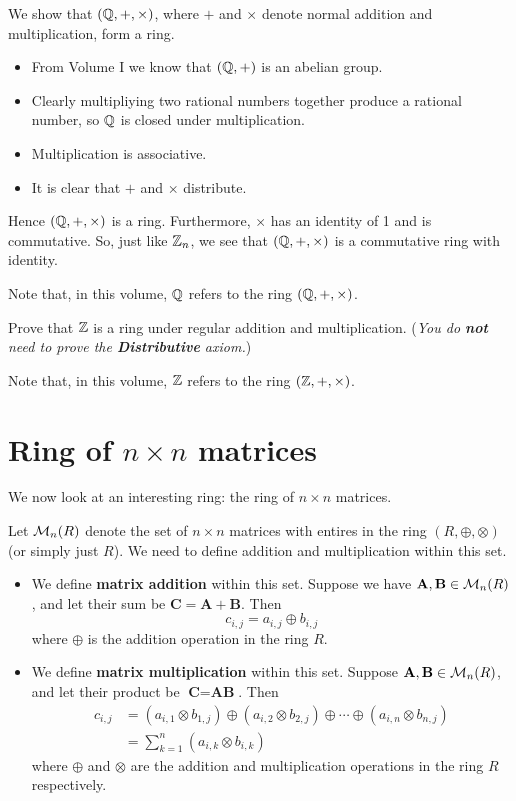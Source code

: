 \begin{example}
    We show that $(\mathbb{Q}, +, \times)$, where $+$ and $\times$ denote normal addition and multiplication, form a ring.
    \begin{itemize}
        \item From Volume I we know that $(\mathbb{Q}, +)$ is an abelian group.
        \item Clearly multipliying two rational numbers together produce a rational number, so $\mathbb{Q}$ is closed under multiplication.
        \item Multiplication is associative.
        \item It is clear that $+$ and $\times$ distribute.
    \end{itemize}
    Hence $(\mathbb{Q}, +, \times)$ is a ring. Furthermore, $\times$ has an identity of 1 and is commutative. So, just like $\mathbb{Z}_{n}$, we see that $(\mathbb{Q}, +, \times)$ is a commutative ring with identity.

    Note that, in this volume, $\mathbb{Q}$ refers to the ring $(\mathbb{Q}, +, \times)$.
\end{example}

\begin{exercise}
    Prove that $\mathbb{Z}$ is a ring under regular addition and multiplication.\newline
    (\textit{You do \textbf{not} need to prove the \textbf{Distributive} axiom.})
\end{exercise}
Note that, in this volume, $\mathbb{Z}$ refers to the ring $(\mathbb{Z}, +, \times)$.

\section{Ring of \texorpdfstring{$n \times n$}{n by n} matrices}
We now look at an interesting ring: the ring of $n \times n$ matrices.

Let $\mathcal{M}_{n}(R)$ denote the set of $n\times n$ matrices with entires in the ring $(R, \oplus, \otimes)$ (or simply just $R$).
We need to define addition and multiplication within this set.
\begin{itemize}
    \item We define \textbf{matrix addition} within this set. Suppose we have $\textbf{A}, \textbf{B} \in \mathcal{M}_{n}(R)$, and let their sum be $\textbf{C} = \textbf{A} + \textbf{B}$. Then
    \[
        c_{i,j} = a_{i,j} \oplus b_{i,j}    
    \]
    where $\oplus$ is the addition operation in the ring $R$.
    
    \item We define \textbf{matrix multiplication} within this set. Suppose $\textbf{A}, \textbf{B} \in \mathcal{M}_{n}(R)$, and let their product be $\textbf{C} = \textbf{AB}$. Then
    \begin{align*}
        c_{i,j} &= (a_{i,1}\otimes b_{1,j}) \oplus (a_{i,2}\otimes b_{2,j}) \oplus \cdots \oplus (a_{i,n}\otimes b_{n,j})\\
        &= \sum_{k=1}^n (a_{i,k}\otimes b_{i,k})
    \end{align*}
    where $\oplus$ and $\otimes$ are the addition and multiplication operations in the ring $R$ respectively.
\end{itemize}

